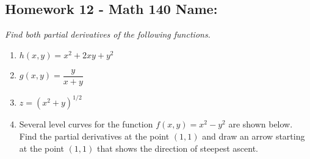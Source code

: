 \documentclass[10pt]{article}
\begin{document}
\pagestyle{empty}
\subsection*{Homework 12 - Math 140 \hfill Name: \underline{\hspace*{2in}}}

\noindent
\textit{Find both partial derivatives of the following functions.}

\begin{enumerate}
\item $h(x,y) = x^2 + 2xy + y^2$
\begin{enumerate}
\end{enumerate}
\vfill


\item $g(x,y) = \dfrac{y}{x+y}$
\begin{enumerate}
\end{enumerate}
\vfill

\item $z = (x^2 + y)^{1/2}$
\begin{enumerate}
\end{enumerate}
\vfill


\item Several level curves for the function $f(x,y) = x^2 - y^2$ are shown below.  Find the partial derivatives at the point $(1,1)$ and draw an arrow starting at the point $(1,1)$ that shows the direction of steepest ascent.


\end{enumerate}
\end{document}
